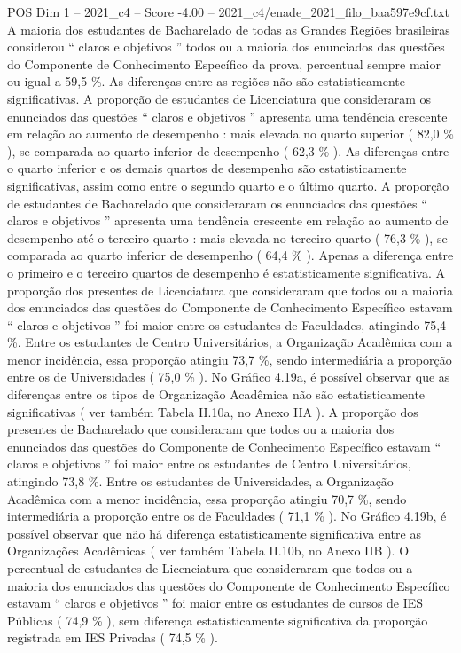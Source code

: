 \begin{textsample}{POS Dim 1 – 2021\_c4 – Score -4.00 – 2021\_c4/enade\_2021\_filo\_baa597e9cf.txt}
A maioria dos estudantes de Bacharelado de todas as Grandes Regiões brasileiras considerou “ claros e objetivos ” todos ou a maioria dos enunciados das questões do Componente de Conhecimento Específico da prova, percentual sempre maior ou igual a 59,5 \%.
As diferenças entre as regiões não são estatisticamente significativas.
A proporção de estudantes de Licenciatura que consideraram os enunciados das questões “ claros e objetivos ” apresenta uma tendência crescente em relação ao aumento de desempenho : mais elevada no quarto superior ( 82,0 \% ), se comparada ao quarto inferior de desempenho ( 62,3 \% ).
As diferenças entre o quarto inferior e os demais quartos de desempenho são estatisticamente significativas, assim como entre o segundo quarto e o último quarto.
A proporção de estudantes de Bacharelado que consideraram os enunciados das questões “ claros e objetivos ” apresenta uma tendência crescente em relação ao aumento de desempenho até o terceiro quarto : mais elevada no terceiro quarto ( 76,3 \% ), se comparada ao quarto inferior de desempenho ( 64,4 \% ).
Apenas a diferença entre o primeiro e o terceiro quartos de desempenho é estatisticamente significativa.
A proporção dos presentes de Licenciatura que consideraram que todos ou a maioria dos enunciados das questões do Componente de Conhecimento Específico estavam “ claros e objetivos ” foi maior entre os estudantes de Faculdades, atingindo 75,4 \%.
Entre os estudantes de Centro Universitários, a Organização Acadêmica com a menor incidência, essa proporção atingiu 73,7 \%, sendo intermediária a proporção entre os de Universidades ( 75,0 \% ).
No Gráfico 4.19a, é possível observar que as diferenças entre os tipos de Organização Acadêmica não são estatisticamente significativas ( ver também Tabela II.10a, no Anexo IIA ).
A proporção dos presentes de Bacharelado que consideraram que todos ou a maioria dos enunciados das questões do Componente de Conhecimento Específico estavam “ claros e objetivos ” foi maior entre os estudantes de Centro Universitários, atingindo 73,8 \%.
Entre os estudantes de Universidades, a Organização Acadêmica com a menor incidência, essa proporção atingiu 70,7 \%, sendo intermediária a proporção entre os de Faculdades ( 71,1 \% ).
No Gráfico 4.19b, é possível observar que não há diferença estatisticamente significativa entre as Organizações Acadêmicas ( ver também Tabela II.10b, no Anexo IIB ).
O percentual de estudantes de Licenciatura que consideraram que todos ou a maioria dos enunciados das questões do Componente de Conhecimento Específico estavam “ claros e objetivos ” foi maior entre os estudantes de cursos de IES Públicas ( 74,9 \% ), sem diferença estatisticamente significativa da proporção registrada em IES Privadas ( 74,5 \% ).

\end{textsample}
